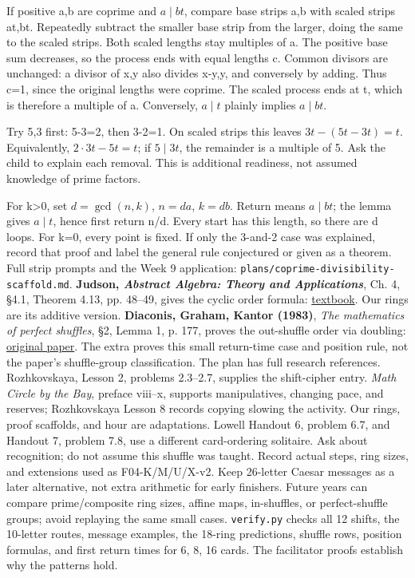 \documentclass[12pt]{extarticle}
\begin{document}
\newpage
{}
If positive a,b are coprime and \(a\mid bt\), compare base strips a,b with scaled strips at,bt. Repeatedly subtract the smaller base strip from the larger, doing the same to the scaled strips. Both scaled lengths stay multiples of a. The positive base sum decreases, so the process ends with equal lengths c. Common divisors are unchanged: a divisor of x,y also divides x-y,y, and conversely by adding. Thus c=1, since the original lengths were coprime. The scaled process ends at t, which is therefore a multiple of a. Conversely, \(a\mid t\) plainly implies \(a\mid bt\).
\par
Try 5,3 first: 5-3=2, then 3-2=1. On scaled strips this leaves \(3t-(5t-3t)=t\). Equivalently, \(2\cdot3t-5t=t\); if \(5\mid3t\), the remainder is a multiple of 5. Ask the child to explain each removal. This is additional readiness, not assumed knowledge of prime factors.
\par
For k>0, set \(d=\gcd(n,k)\), \(n=da\), \(k=db\). Return means \(a\mid bt\); the lemma gives \(a\mid t\), hence first return n/d. Every start has this length, so there are d loops. For k=0, every point is fixed. If only the 3-and-2 case was explained, record that proof and label the general rule conjectured or given as a theorem. Full strip prompts and the Week 9 application: \texttt{plans/coprime-divisibility-scaffold.md}.
\textbf{Judson, \emph{Abstract Algebra: Theory and Applications}}, Ch. 4, \S4.1, Theorem 4.13, pp. 48--49, gives the cyclic order formula: \href{https://people.hsc.edu/faculty-staff/blins/books/JudsonAbstractAlgebra.pdf}{textbook}. Our rings are its additive version.
\textbf{Diaconis, Graham, Kantor (1983)}, \emph{The mathematics of perfect shuffles}, \S2, Lemma 1, p. 177, proves the out-shuffle order via doubling: \href{https://pages.uoregon.edu/kantor/PAPERS/PerfectShuffles.pdf}{original paper}. The extra proves this small return-time case and position rule, not the paper's shuffle-group classification. The plan has full research references.
Rozhkovskaya, Lesson 2, problems 2.3--2.7, supplies the shift-cipher entry. \emph{Math Circle by the Bay}, preface viii--x, supports manipulatives, changing pace, and reserves; Rozhkovskaya Lesson 8 records copying slowing the activity. Our rings, proof scaffolds, and hour are adaptations. Lowell Handout 6, problem 6.7, and Handout 7, problem 7.8, use a different card-ordering solitaire. Ask about recognition; do not assume this shuffle was taught.
Record actual steps, ring sizes, and extensions used as F04-K/M/U/X-v2. Keep 26-letter Caesar messages as a later alternative, not extra arithmetic for early finishers. Future years can compare prime/composite ring sizes, affine maps, in-shuffles, or perfect-shuffle groups; avoid replaying the same small cases.
\texttt{verify.py} checks all 12 shifts, the 10-letter routes, message examples, the 18-ring predictions, shuffle rows, position formulas, and first return times for 6, 8, 16 cards. The facilitator proofs establish why the patterns hold.
\end{document}
